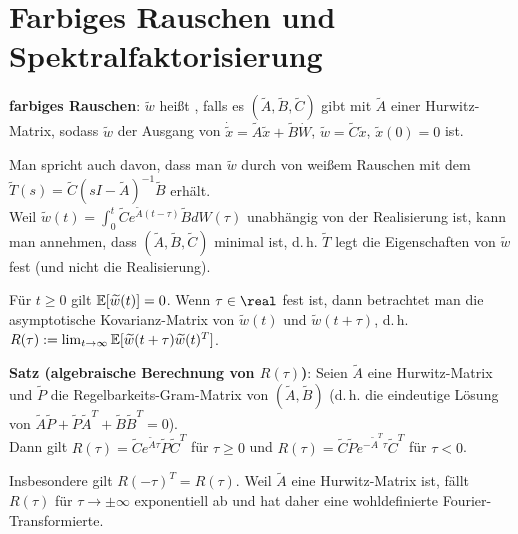 \pagebreak

\section{%
    Farbiges Rauschen und Spektralfaktorisierung%
}

\textbf{farbiges Rauschen}:
$\widetilde{w}$ heißt , falls es
$(\widetilde{A}, \widetilde{B}, \widetilde{C})$ gibt
mit $\widetilde{A}$ einer Hurwitz-Matrix, sodass
$\widetilde{w}$ der Ausgang von
$\dot{\widetilde{x}} = \widetilde{A} \widetilde{x} + \widetilde{B} \dot{W}$,
$\widetilde{w} = \widetilde{C} \widetilde{x}$, $\widetilde{x}(0) = 0$ ist.

Man spricht auch davon, dass man $\widetilde{w}$ durch
 von weißem Rauschen mit dem 
$\widetilde{T}(s) = \widetilde{C} (sI - \widetilde{A})^{-1} \widetilde{B}$ erhält.\\
Weil $\widetilde{w}(t) = \int_0^t \widetilde{C} e^{\widetilde{A}(t - \tau)} \widetilde{B} dW(\tau)$
unabhängig von der Realisierung ist, kann man annehmen, dass
$(\widetilde{A}, \widetilde{B}, \widetilde{C})$ minimal ist,
d.\,h. $\widetilde{T}$ legt die Eigenschaften von $\widetilde{w}$ fest
(und nicht die Realisierung).

\linie

Für $t \ge 0$ gilt $\mathbb{E}[\widetilde{w}(t)] = 0$.
Wenn $\tau \in \real$ fest ist, dann betrachtet man die asymptotische Kovarianz-Matrix von
$\widetilde{w}(t)$ und $\widetilde{w}(t + \tau)$, d.\,h.
$R(\tau) := \lim_{t \to \infty} \mathbb{E}[\widetilde{w}(t + \tau) \widetilde{w}(t)^T]$.

\textbf{Satz (algebraische Berechnung von $R(\tau)$)}:
Seien $\widetilde{A}$ eine Hurwitz-Matrix und $\widetilde{P}$ die Regelbarkeits-Gram-Matrix
von $(\widetilde{A}, \widetilde{B})$
(d.\,h. die eindeutige Lösung von
$\widetilde{A} \widetilde{P} +
\widetilde{P} \widetilde{A}^T + \widetilde{B} \widetilde{B}^T = 0$).\\
Dann gilt
$R(\tau) = \widetilde{C} e^{\widetilde{A}\tau} \widetilde{P} \widetilde{C}^T$ für $\tau \ge 0$ und
$R(\tau) = \widetilde{C} \widetilde{P} e^{-\widetilde{A}^T\tau} \widetilde{C}^T$ für $\tau < 0$.

Insbesondere gilt $R(-\tau)^T = R(\tau)$.
Weil $\widetilde{A}$ eine Hurwitz-Matrix ist, fällt $R(\tau)$ für $\tau \rightarrow \pm\infty$
exponentiell ab und hat daher eine wohldefinierte Fourier-Transformierte.

